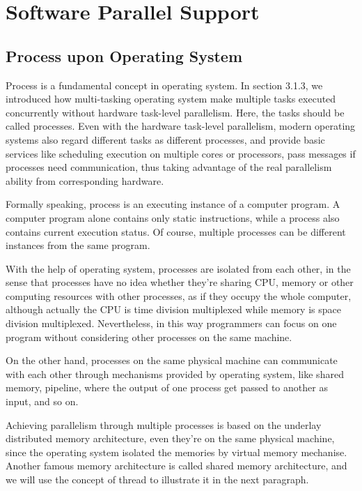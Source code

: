 \documentclass[12pt,a4]{report}
\begin{document}
\section{Software Parallel Support}

\subsection{Process upon Operating System}

Process is a fundamental concept in operating system. In section 3.1.3, we introduced how multi-tasking operating system make multiple tasks executed concurrently without hardware task-level parallelism. Here, the tasks should be called processes. Even with the hardware task-level parallelism, modern operating systems also regard different tasks as different processes, and provide basic services like scheduling execution on multiple cores or processors, pass messages if processes need communication, thus taking advantage of the real parallelism ability from corresponding hardware.

Formally speaking, process is an executing instance of a computer program. A computer program alone contains only static instructions, while a process also contains current execution status. Of course, multiple processes can be different instances from the same program.

With the help of operating system, processes are isolated from each other, in the sense that processes have no idea whether they're sharing CPU, memory or other computing resources with other processes, as if they occupy the whole computer, although actually the CPU is time division multiplexed while memory is space division multiplexed. Nevertheless, in this way programmers can focus on one program without considering other processes on the same machine.

On the other hand, processes on the same physical machine can communicate with each other through mechanisms provided by operating system, like shared memory, pipeline, where the output of one process get passed to another as input, and so on.

Achieving parallelism through multiple processes is based on the underlay distributed memory architecture, even they're on the same physical machine, since the operating system isolated the memories by virtual memory mechanise. Another famous memory architecture is called shared memory architecture, and we will use the concept of thread to illustrate it in the next paragraph.
\end{document}
